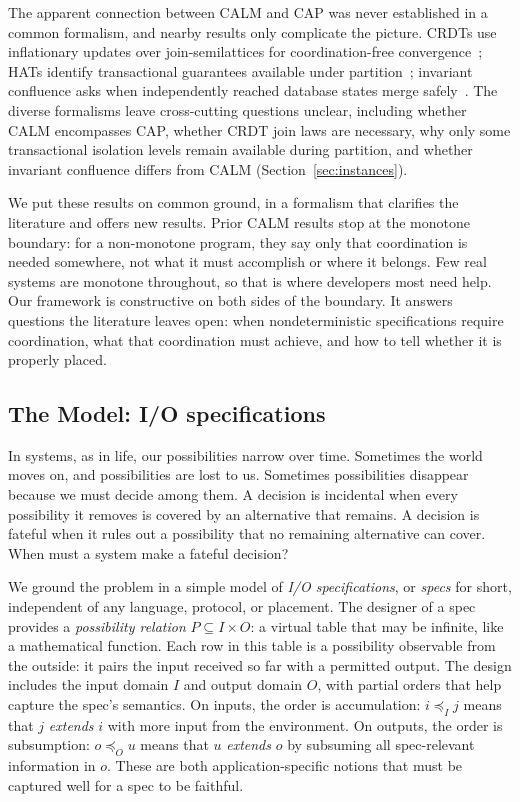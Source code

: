 \documentclass[sigconf]{cidr-2027}
\theoremstyle{remark}
\newcommand{\InputOrd}{\preceq_I}
\newcommand{\OutputOrd}{\preceq_O}
\newcommand{\inrel}{extends\xspace}          %
\newcommand{\outrel}{extends\xspace}          %
\newcommand{\spectype}[1][]{I/O specification#1\xspace}
\newcommand{\Spectype}[1][]{I/O specification#1\xspace}
\begin{document}
The apparent connection between CALM and CAP was never established in a common
formalism, and nearby results only complicate the picture. CRDTs use
inflationary updates over join-semilattices for coordination-free
convergence~\cite{shapiro2011crdt}; HATs identify transactional guarantees
available under partition~\cite{bailis2013hat}; invariant confluence asks when
independently reached database states merge
safely~\cite{bailis2014coordination}. The diverse formalisms leave cross-cutting
questions unclear, including whether CALM encompasses CAP, whether CRDT join
laws are necessary, why only some transactional isolation levels remain
available during partition, and whether invariant confluence differs from CALM
(Section~\ref{sec:instances}).

We put these results on common ground, in a formalism that clarifies the
literature and offers new results.  Prior CALM results stop at the monotone
boundary: for a non-monotone program, they say only that coordination is needed
somewhere, not what it must accomplish or where it belongs.  Few real systems
are monotone throughout, so that is where developers most need help.  Our
framework is constructive on both sides of the boundary.  It answers questions
the literature leaves open: when nondeterministic specifications require
coordination, what that coordination must achieve, and how to tell whether it is
properly placed.

\subsection{The Model: \Spectype[s]}
In systems, as in life, our possibilities narrow over time. Sometimes the world
moves on, and possibilities are lost to us. Sometimes possibilities disappear
because we must decide among them. A decision is incidental when
every possibility it removes is covered by an alternative that remains. A
decision is fateful when it rules out a possibility that no remaining
alternative can cover. When must a system make a fateful decision?

We ground the problem in a simple model of \emph{\spectype[s]}, or \emph{specs}
for short, independent of any language, protocol, or placement. The designer of
a spec provides a \emph{possibility relation} $P\subseteq I\times O$: a virtual
table that may be infinite, like a mathematical function. Each row in this table
is a possibility observable from the outside: it pairs the input received so far
with a permitted output. The design includes the input domain $I$ and output domain $O$,
with partial orders that help capture the spec's semantics.  On inputs, the order
is accumulation: $i\InputOrd j$ means that $j$ \emph{\inrel} $i$ with more input
from the environment.  On outputs, the order is subsumption: $o\OutputOrd u$
means that  $u$ \emph{\outrel} $o$ by subsuming all spec-relevant information in
$o$. These are both application-specific notions that must be captured well for
a spec to be faithful.
\end{document}
